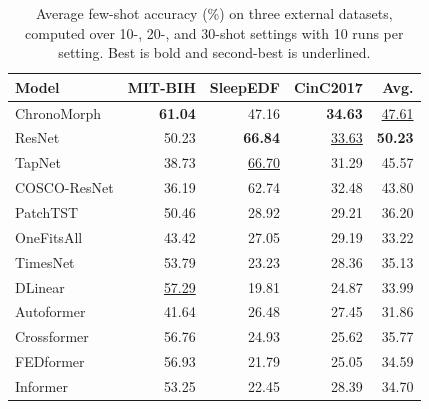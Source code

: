 \begin{table}[t]
\centering
\caption{Average few-shot accuracy (\%) on three external datasets, computed over 10-, 20-, and 30-shot settings with 10 runs per setting. Best is bold and second-best is underlined.}
\label{tab:external-fewshot-avg}
\begin{tabular}{lrrrr}
\toprule
Model & MIT-BIH & SleepEDF & CinC2017 & Avg. \\
\midrule
ChronoMorph & \textbf{61.04} & 47.16 & \textbf{34.63} & \underline{47.61} \\
ResNet & 50.23 & \textbf{66.84} & \underline{33.63} & \textbf{50.23} \\
TapNet & 38.73 & \underline{66.70} & 31.29 & 45.57 \\
COSCO-ResNet & 36.19 & 62.74 & 32.48 & 43.80 \\
PatchTST & 50.46 & 28.92 & 29.21 & 36.20 \\
OneFitsAll & 43.42 & 27.05 & 29.19 & 33.22 \\
TimesNet & 53.79 & 23.23 & 28.36 & 35.13 \\
DLinear & \underline{57.29} & 19.81 & 24.87 & 33.99 \\
Autoformer & 41.64 & 26.48 & 27.45 & 31.86 \\
Crossformer & 56.76 & 24.93 & 25.62 & 35.77 \\
FEDformer & 56.93 & 21.79 & 25.05 & 34.59 \\
Informer & 53.25 & 22.45 & 28.39 & 34.70 \\
\bottomrule
\end{tabular}
\end{table}
